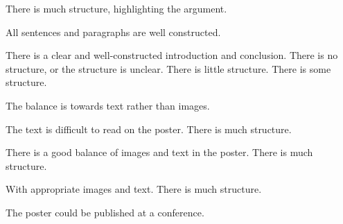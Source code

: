 \documentclass{../../fal_assignment}
\begin{document}
\begin{markingrubric}
	\grade 		There is much structure, highlighting the argument.
	\par 		All sentences and paragraphs are well constructed.
	\par 		There is a clear and well-constructed introduction and conclusion.
	\grade\fail 	There is no structure, or the structure is unclear.
	\grade 		There is little structure.
	\grade 		There is some structure.
	\par 		The balance is towards text rather than images.
	\par		The text is difficult to read on the poster.
	\grade 		There is much structure.
	\par 		There is a good balance of images and text in the poster.
	\grade 		There is much structure.
	\par 		With appropriate images and text.
	\grade 		There is much structure.
	\par 		The poster could be published at a conference.
\end{markingrubric}
\end{document}
